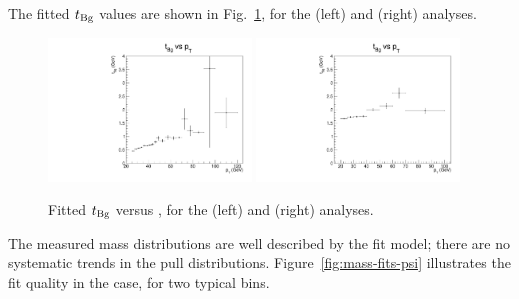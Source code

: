 The fitted $t_{\rm Bg}$ values are shown in Fig.~\ref{fig:tbkg-psi}, 
for the \jpsi (left) and \psip (right) analyses.

\begin{figure}[h]
\centering
\includegraphics[width=0.48\textwidth]{Figures/chapter4/par_tbkg-jpsi.pdf}
\includegraphics[width=0.48\textwidth]{Figures/chapter4/par_tbkg-psip.pdf}
\caption{Fitted $t_{\rm Bg}$ versus \pt, for the \jpsi (left) and \psip (right) analyses.}
\label{fig:tbkg-psi}
\end{figure}

\vfill\newpage

The measured mass distributions are well described by the fit model;
there are no systematic trends in the pull distributions. 
Figure~\ref{fig:mass-fits-psi} illustrates the fit quality in the \jpsi case, 
for two typical \pt bins.


